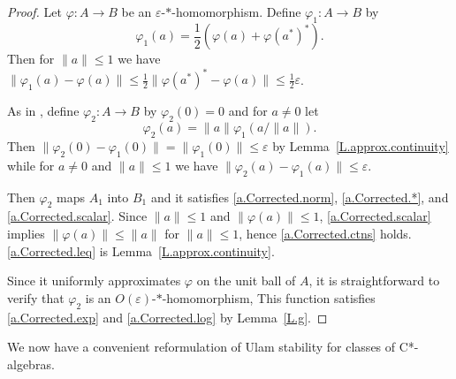 \documentclass[11pt]{amsproc}
\newcommand{\cstar}{C*}
\theoremstyle{definition}
\theoremstyle{plain}
\theoremstyle{remark}
\begin{document}
\begin{proof}
	Let $\varphi\colon A\to B$ be an $\varepsilon$-$*$-homomorphism. Define $\varphi_1\colon A\to B$ by 
	\[
	\varphi_1(a)=\frac 12 (\varphi(a)+\varphi(a^*)^*). 
	\]
	Then for $\|a\|\leq 1$ we have $\|\varphi_1(a)-\varphi(a)\|\leq \frac 12 \|\varphi(a^*)^*-\varphi(a)\|\leq \frac 12\varepsilon$. 
	
	As in \cite[Theorem 5.18]{farah2025corona}, 
	define $\varphi_2\colon A\to B$ by $\varphi_2(0)=0$ and for $a\neq 0$ let 
	\[
	\varphi_2(a)=\|a\|\varphi_1(a/\|a\|). 
	\]
	Then $\|\varphi_2(0)-\varphi_1(0)\|=\|\varphi_1(0)\|\leq \varepsilon$ by Lemma~\ref{L.approx.continuity} while for $a\neq 0$ and $\|a\|\leq 1$ we have  $\|\varphi_2(a)-\varphi_1(a)\|\leq \varepsilon$. 
	
	Then $\varphi_2$ maps $A_1$ into $B_1$ and it satisfies \eqref{a.Corrected.norm}, \eqref{a.Corrected.*}, and \eqref{a.Corrected.scalar}. 
	Since $\|a\|\leq 1$ and $\|\varphi(a)\|\leq 1$, \eqref{a.Corrected.scalar} implies $\|\varphi(a)\|\leq \|a\|$ for $\|a\|\leq 1$, hence   \eqref{a.Corrected.ctns} holds. \eqref{a.Corrected.leq} is Lemma~\ref{L.approx.continuity}. 
	
	Since it uniformly approximates $\varphi$ on the unit ball of $A$, 
	it is straightforward to verify that $\varphi_2$ is an $O(\varepsilon)$-$*$-homomorphism, 
		This function satisfies \eqref{a.Corrected.exp} and \eqref{a.Corrected.log} by Lemma~\ref{L.g}. 
\end{proof}

We now have a convenient reformulation of Ulam stability for classes of \cstar-algebras. 
\end{document}
